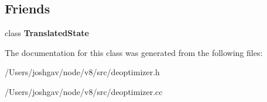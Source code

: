 \subsection*{Friends}
\begin{DoxyCompactItemize}
\item 
class {\bfseries Translated\+State}\hypertarget{classv8_1_1internal_1_1_translated_frame_a93214c289745cbbfea7af56c3a474a3b}{}\label{classv8_1_1internal_1_1_translated_frame_a93214c289745cbbfea7af56c3a474a3b}

\end{DoxyCompactItemize}


The documentation for this class was generated from the following files\+:\begin{DoxyCompactItemize}
\item 
/\+Users/joshgav/node/v8/src/deoptimizer.\+h\item 
/\+Users/joshgav/node/v8/src/deoptimizer.\+cc\end{DoxyCompactItemize}
